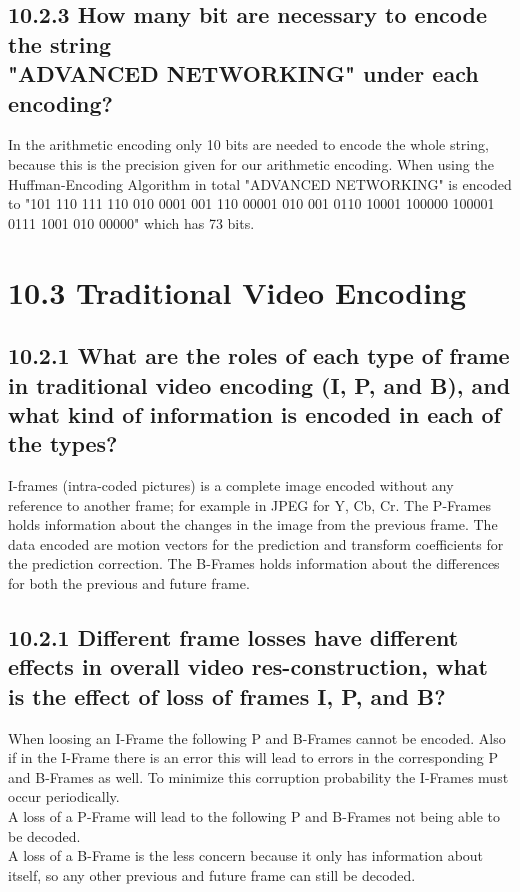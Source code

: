 \documentclass{article}
\begin{document}
\begin{adjustwidth}{2em}{2em}
		\subsection*{10.2.3 How many bit are necessary to encode the string \\ "ADVANCED NETWORKING" under each encoding?}
		\begin{adjustwidth}{2em}{2em}
			In the arithmetic encoding only 10 bits are needed to encode the whole string, because this is the precision given for our arithmetic encoding. When using the Huffman-Encoding Algorithm in total "ADVANCED NETWORKING" is encoded to "101 110 111 110 010 0001 001 110 00001 010 001 0110 10001 100000 100001 0111 1001 010 00000" which has 73 bits.
		\end{adjustwidth}
	\end{adjustwidth}
	
	\section*{10.3 Traditional Video Encoding}
	\begin{adjustwidth}{2em}{2em}
		\subsection*{10.2.1 What are the roles of each type of frame in traditional video encoding (I, P, and B), and what kind of information is encoded in each of the types?}
		\begin{adjustwidth}{2em}{2em}
			I-frames (intra-coded pictures) is a complete image encoded without any reference to another frame; for example in JPEG for Y, Cb, Cr. The P-Frames holds information about the changes in the image from the previous frame. The data encoded are motion vectors for the prediction and transform coefficients for the prediction correction. The B-Frames holds information about the differences for both the previous and future frame.
		\end{adjustwidth}
		\subsection*{10.2.1 Different frame losses have different effects in overall video res-construction, what is the effect of loss of frames I, P, and B?}
		\begin{adjustwidth}{2em}{2em}
			When loosing an I-Frame the following P and B-Frames cannot be encoded. Also if in the I-Frame there is an error this will lead to errors in the corresponding P and B-Frames as well. To minimize this corruption probability the I-Frames must occur periodically. \\
			A loss of a P-Frame will lead to the following P and B-Frames not being able to be decoded. \\
			A loss of a B-Frame is the less concern because it only has information about itself, so any other previous and future frame can still be decoded.
		\end{adjustwidth}
	\end{adjustwidth}
	
\end{document}
